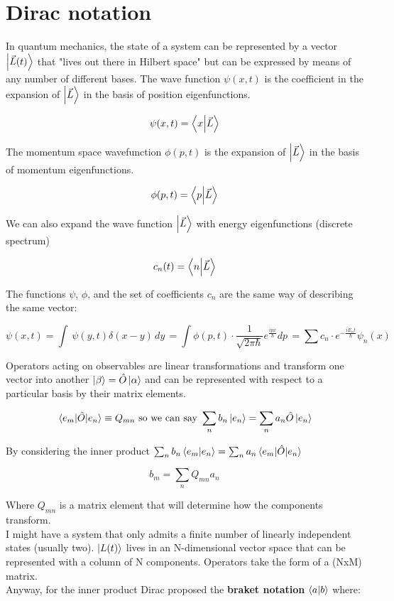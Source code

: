 \chapter{Dirac notation}
In quantum mechanics, the state of a system can be represented by a vector $\ket{\vec{L}(t)}$ that "lives out there in Hilbert space" but can be expressed by means of any number of different bases.
The wave function $\psi(x,t)$ is the coefficient in the expansion of $\ket{\vec{L}}$ in the basis of position eigenfunctions.

$$\psi(x,t)=\braket{x}{\vec{L}}$$

The momentum space wavefunction $\phi(p,t)$ is the expansion of $\ket{\vec{L}}$ in the basis of momentum eigenfunctions.

$$\phi(p,t)=\braket{p}{\vec{L}}$$

We can also expand the wave function $\ket{\vec{L}}$ with energy eigenfunctions (discrete spectrum)

$$c_n(t)=\braket{n}{\vec{L}}$$

The functions $\psi$, $\phi$, and the set of coefficients ${c_n}$ are the same way of describing the same vector:

$$\psi(x,t)=\int\ \psi(y,t)\delta(x-y)\,dy\,=\int\phi(p,t)\cdot\frac{1}{\sqrt{2\pi \hbar}}e^{\frac{ipx}{\hbar}}dp\,=\sum c_n\cdot e^{-\frac{iE_nt}{\hbar}}\psi_n(x)$$

Operators acting on observables are linear transformations and transform one vector into another $\ket{\beta}=\hat{O}\ket{\alpha}$ and can be represented with respect to a particular basis by their matrix elements.

$$\mel{e_m}{\hat{O}}{e_n}\equiv Q_{mn} \text{ so we can say }\sum_n b_n\ket{e_n}=\sum_na_n\hat{O}\ket{e_n}$$

By considering the inner product $\sum_nb_n\braket{e_m}{e_n}=\sum_na_n\mel{e_m}{\hat{O}}{e_n}$

$$b_m=\sum_nQ_{mn}a_n$$

Where $Q_{mn}$ is a matrix element that will determine how the components transform.\\
I might have a system that only admits a finite number of linearly independent states (usually two). $\ket{L(t)}$ lives in an N-dimensional vector space that can be represented with a column of N components. Operators take the form of a (NxM) matrix.\\
Anyway, for the inner product Dirac proposed the \textbf{braket notation} $\braket{a}{b}$ where:

